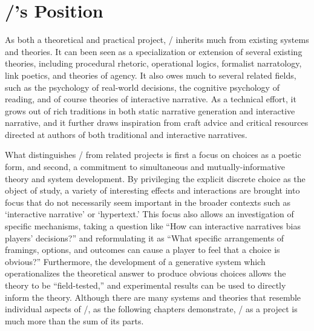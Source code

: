 




\section{\dunyazad/'s Position}

As both a theoretical and practical project, \dunyazad/ inherits much from existing systems and theories.
%
It can been seen as a specialization or extension of several existing theories, including procedural rhetoric, operational logics, formalist narratology, link poetics, and theories of agency.
%
It also owes much to several related fields, such as the psychology of real-world decisions, the cognitive psychology of reading, and of course theories of interactive narrative.
%
As a technical effort, it grows out of rich traditions in both static narrative generation and interactive narrative, and it further draws inspiration from craft advice and critical resources directed at authors of both traditional and interactive narratives.


What distinguishes \dunyazad/ from related projects is first a focus on choices as a poetic form, and second, a commitment to simultaneous and mutually-informative theory and system development.
%
By privileging the explicit discrete choice as the object of study, a variety of interesting effects and interactions are brought into focus that do not necessarily seem important in the broader contexts such as `interactive narrative' or `hypertext.'
%
This focus also allows an investigation of specific mechanisms, taking a question like ``How can interactive narratives bias players' decisions?'' and reformulating it as ``What specific arrangements of framings, options, and outcomes can cause a player to feel that a choice is obvious?''
%
Furthermore, the development of a generative system which operationalizes the theoretical answer to produce obvious choices allows the theory to be ``field-tested,'' and experimental results can be used to directly inform the theory.
%
Although there are many systems and theories that resemble individual aspects of \dunyazad/, as the following chapters demonstrate, \dunyazad/ as a project is much more than the sum of its parts.
